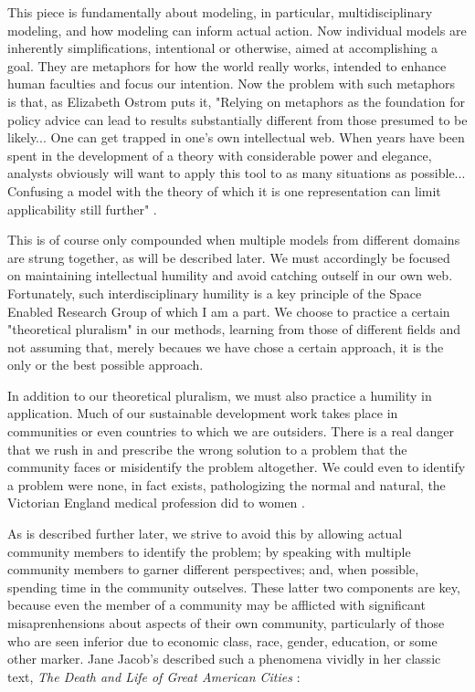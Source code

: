 This piece is fundamentally about modeling, in particular, multidisciplinary modeling, and how modeling can inform actual action. Now individual models are inherently simplifications, intentional or otherwise, aimed at accomplishing a goal. They are metaphors for how the world really works, intended to enhance human faculties and focus our intention. Now the problem with such metaphors is that, as Elizabeth Ostrom puts it, "Relying on metaphors as the foundation for policy advice can lead to results substantially different from those presumed to be likely... One can get trapped in one's own intellectual web. When years have been spent in the development of a theory with considerable power and elegance, analysts obviously will want to apply this tool to as many situations as possible... Confusing a model with the theory of which it is one representation can limit applicability still further" \cite{ostromGoverningCommonsEvolution2015}. 

This is of course only compounded when multiple models from different domains are strung together, as will be described later. We must accordingly be focused on maintaining intellectual humility and avoid catching outself in our own web. Fortunately, such interdisciplinary humility is a key principle of the Space Enabled Research Group of which I am a part. We choose to practice a certain "theoretical pluralism" \cite{turkleEmpathyDiariesMemoir2021} in our methods, learning from those of different fields and not assuming that, merely becaues we have chose a certain approach, it is the only or the best possible approach.

In addition to our theoretical pluralism, we must also practice a humility in application. Much of our sustainable development work takes place in communities or even countries to which we are outsiders. There is a real danger that we rush in and prescribe the wrong solution to a problem that the community faces or misidentify the problem altogether. We could even to identify a problem were none, in fact exists, pathologizing the normal and natural, the Victorian England medical profession did to women \cite{delamontConspicuousConsumptiveWoman2012}. 

As is described further later, we strive to avoid this by allowing actual community members to identify the problem; by speaking with multiple community members to garner different perspectives; and, when possible, spending time in the community outselves. These latter two components are key, because even the member of a community may be afflicted with significant misaprenhensions about aspects of their own community, particularly of those who are seen inferior due to economic class, race, gender, education, or some other marker. Jane Jacob's described such a phenomena vividly in her classic text, \textit{The Death and Life of Great American Cities} \cite{jacobsDeathLifeGreat2016}:

